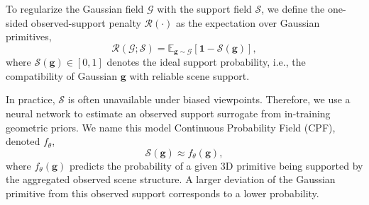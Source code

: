 \documentclass[lettersize,journal]{IEEEtran}
\begin{document}
To regularize the Gaussian field $\mathcal{G}$ with the support field $\mathcal{S}$, we define the one-sided observed-support penalty $\mathcal{R}(\cdot)$ as the expectation over Gaussian primitives, 
\begin{equation}
    \mathcal{R}(\mathcal{G};\mathcal{S}) = \mathbb{E}_{\mathbf{g} \sim \mathcal{G}} \left[ \mathbf{1} - \mathcal{S} (\mathbf{g}) \right],
    \label{eq9}
\end{equation}
where $\mathcal{S} (\mathbf{g}) \in [0, 1]$ denotes the ideal support probability, i.e., the compatibility of Gaussian $\mathbf{g}$ with reliable scene support.

In practice, $\mathcal{S}$ is often unavailable under biased viewpoints. Therefore, we use a neural network to estimate an observed support surrogate from in-training geometric priors. We name this model Continuous Probability Field (CPF), denoted $f_{\theta}$, 
\begin{equation}
    \mathcal{S}(\mathbf{g}) \approx f_{\theta}(\mathbf{g}), 
    \label{eq10}
\end{equation}
where $f_{\theta}(\mathbf{g})$ predicts the probability of a given 3D primitive being supported by the aggregated observed scene structure. 
A larger deviation of the Gaussian primitive from this observed support corresponds to a lower probability.
\end{document}
